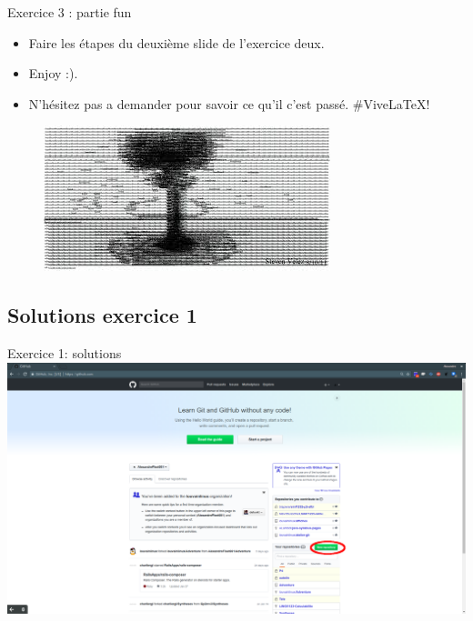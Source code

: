 \documentclass{beamer}
\begin{document}
\begin{frame}{Exercice 3 : partie fun}
    \begin{itemize}
        \item Faire les étapes du deuxième slide de l'exercice deux.
        \item Enjoy :). 
        \item N'hésitez pas a demander pour savoir ce qu'il c'est passé. \#ViveLaTeX!
    \end{itemize}
    \begin{figure}
    \centering
    \includegraphics[width=.7\textwidth]{img/image_exercices/explosion.jpeg}
    \end{figure}
\end{frame}

\subsection{Solutions exercice 1}
\begin{frame}{Exercice 1: solutions}
    \centering
    \includegraphics[width=\textwidth]{img/image_exercices/repo_creat.png}
\end{frame}
\end{document}
